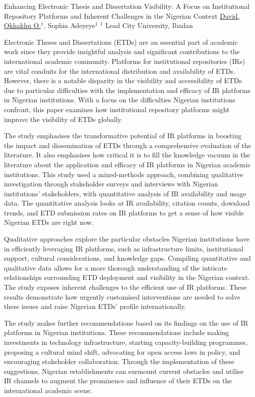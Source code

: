 \begin{abstract_online}{Enhancing Electronic Thesis and Dissertation Visibility: A Focus on Institutional Repository Platforms and Inherent Challenges in the Nigerian Context}{%
        \underline{David, Okhakhu O.}$^{1}$, Sophia Adeyeye$^{1}$}{%
        }{%
        $^1$ Lead City University, Ibadan}

    Electronic Theses and Dissertations (ETDs) are an essential part of academic work since they provide insightful analysis and significant contributions to the international academic community. Platforms for institutional repositories (IRs) are vital conduits for the international distribution and availability of ETDs. However, there is a notable disparity in the visibility and accessibility of ETDs due to particular difficulties with the implementation and efficacy of IR platforms in Nigerian institutions. With a focus on the difficulties Nigerian institutions confront, this paper examines how institutional repository platforms might improve the visibility of ETDs globally. 

    The study emphasises the transformative potential of IR platforms in boosting the impact and dissemination of ETDs through a comprehensive evaluation of the literature. It also emphasises how critical it is to fill the knowledge vacuum in the literature about the application and efficacy of IR platforms in Nigerian academic institutions. This study used a mixed-methods approach, combining qualitative investigation through stakeholder surveys and interviews with Nigerian institutions' stakeholders, with quantitative analysis of IR availability and usage data. The quantitative analysis looks at IR availability, citation counts, download trends, and ETD submission rates on IR platforms to get a sense of how visible Nigerian ETDs are right now. 

    Qualitative approaches explore the particular obstacles Nigerian institutions have in efficiently leveraging IR platforms, such as infrastructure limits, institutional support, cultural considerations, and knowledge gaps. Compiling quantitative and qualitative data allows for a more thorough understanding of the intricate relationships surrounding ETD deployment and visibility in the Nigerian context. The study exposes inherent challenges to the efficient use of IR platforms. These results demonstrate how urgently customised interventions are needed to solve these issues and raise Nigerian ETDs' profile internationally. 

    The study makes further recommendations based on its findings on the use of IR platforms in Nigerian institutions. These recommendations include making investments in technology infrastructure, starting capacity-building programmes, proposing a cultural mind shift, advocating for open access laws in policy, and encouraging stakeholder collaboration. Through the implementation of these suggestions, Nigerian establishments can surmount current obstacles and utilise IR channels to augment the prominence and influence of their ETDs on the international academic scene. 


\end{abstract_online}
